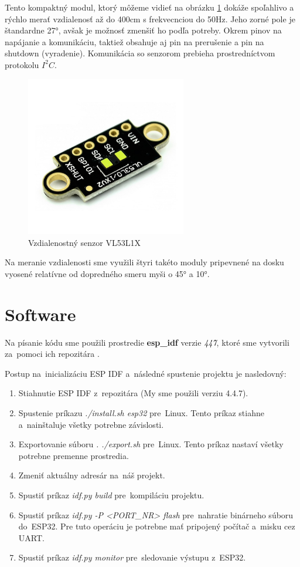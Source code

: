 Tento kompaktný modul, ktorý môžeme vidieť na obrázku  \ref{fig:vl53l1x} dokáže spoľahlivo a rýchlo merať vzdialenosť až do 400cm s frekvecnciou do 50Hz. Jeho zorné pole je štandardne 27°, avšak je možnosť zmenšiť ho podľa potreby. Okrem pinov na napájanie a komunikáciu, taktiež obsahuje aj pin na prerušenie a pin na shutdown (vyradenie). Komunikácia so senzorom prebieha prostredníctvom protokolu $I^2 C$.

\begin{figure}[!htpb]
    \centering
    \includegraphics[width=7cm]{includes/images/vl53l1x.jpg}
    \caption{Vzdialenostný senzor VL53L1X}
    \label{fig:vl53l1x}
\end{figure}

Na meranie vzdialenosti sme využili štyri takéto moduly pripevnené na dosku vyosené relatívne od dopredného smeru myši o 45° a 10°.

\section{Software}
\label{sec:software}

Na písanie kódu sme použili prostredie \textbf{esp\_idf} verzie \textit{4\.4\.7}, ktoré sme vytvorili za~pomoci
ich repozitára \cite{espGithub}.

Postup na~inicializáciu ESP IDF a~následné spustenie projektu je nasledovný:
\begin{enumerate}
	\item Stiahnutie ESP IDF z~repozitára \cite{espGithub} (My sme použili verziu 4.4.7).
	\item Spustenie príkazu \textit{./install.sh esp32} pre~Linux.
		Tento príkaz stiahne a~nainštaluje všetky potrebne závislosti.
	\item Exportovanie súboru \textit{. ./export.sh} pre~Linux.
		Tento príkaz nastaví všetky potrebne premenne prostredia.
	\item Zmeniť aktuálny adresár na~náš projekt.
	\item Spustiť príkaz \textit{idf.py build} pre~kompiláciu projektu.
	\item Spustiť príkaz \textit{idf.py -P <PORT\_NR> flash} pre~nahratie binárneho súboru do~ESP32.
		Pre tuto operáciu je potrebne mať pripojený počítač a~misku cez UART.
	\item Spustiť príkaz \textit{idf.py monitor} pre~sledovanie výstupu z~ESP32.
\end{enumerate}

